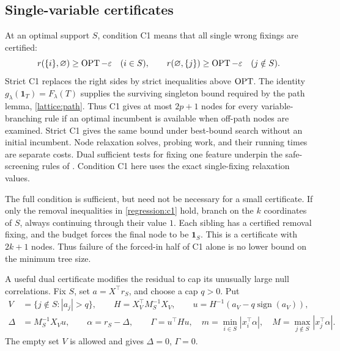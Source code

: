 \subsection{Single-variable certificates}
\label{regression:single}

At an optimal support $S$, condition C1 means that all single wrong
fixings are certified:
\begin{equation}\label{regression:c1}
 r(\{i\},\varnothing)\geq\operatorname{OPT}-\varepsilon\quad(i\in S),
 \qquad r(\varnothing,\{j\})\geq\operatorname{OPT}-\varepsilon\quad(j\notin S).
\end{equation}
Strict C1 replaces the right sides by strict inequalities above $\operatorname{OPT}$.
The identity $g_\lambda(\mathbf1_T)=F_\lambda(T)$ supplies the
surviving singleton bound required by the path lemma,
\cref{lattice:path}. Thus C1 gives at most $2p+1$ nodes
for every variable-branching rule if an optimal incumbent is available
when off-path nodes are examined. Strict C1 gives the same bound under
best-bound search without an initial incumbent. Node relaxation solves,
probing work, and their running times are separate costs.
Dual sufficient tests for fixing one feature underpin the safe-screening
rules of \citet{atamturkGomez2020SafeScreening}. Condition C1 here uses
the exact single-fixing relaxation values.

The full condition is sufficient, but need not be necessary for a small
certificate. If only the removal inequalities in
\eqref{regression:c1} hold, branch on the $k$ coordinates of $S$, always
continuing through their value $1$. Each sibling has a certified removal
fixing, and the budget forces the final node to be $\mathbf1_S$. This is
a certificate with $2k+1$ nodes. Thus failure of the forced-in half of
C1 alone is no lower bound on the minimum tree size.

A useful dual certificate modifies the residual to cap its unusually
large null correlations. Fix $S$, set $a=X^\top r_S$, and choose a cap
$q>0$. Put
\begin{align}
 V&=\{j\notin S:|a_j|>q\},\qquad
 H=X_V^\top M_S^{-1}X_V,\qquad
 u=H^{-1}(a_V-q\operatorname{sign}(a_V)),\label{regression:saturation}\\
 \Delta&=M_S^{-1}X_Vu,\qquad \alpha=r_S-\Delta,\qquad
 \Gamma=u^\top Hu,\quad
 m=\min_{i\in S}|x_i^\top\alpha|,\quad
 M=\max_{j\notin S}|x_j^\top\alpha|.\label{regression:saturation-quantities}
\end{align}
The empty set $V$ is allowed and gives $\Delta=0$, $\Gamma=0$.

